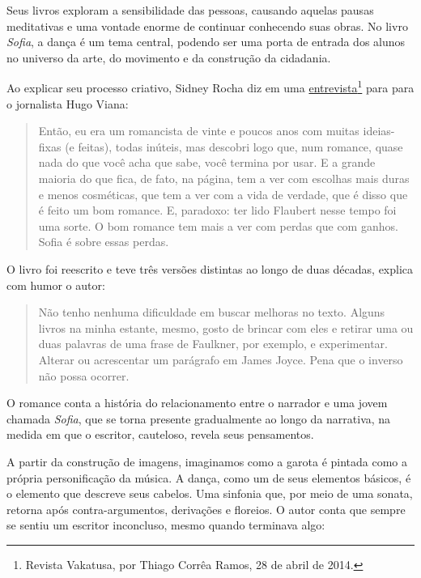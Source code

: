 \documentclass[12pt]{extarticle}
\begin{document}
Seus livros exploram a sensibilidade das pessoas, causando aquelas pausas
meditativas e uma vontade enorme de continuar conhecendo suas obras.  No livro
\textit{Sofia}, a dança é um tema central, podendo ser uma porta de entrada dos alunos
no universo da arte, do movimento e da construção da cidadania. 

Ao explicar seu processo criativo, Sidney Rocha diz em uma 
\href{http://www.vacatussa.com/entrevista-sidney-rocha/}{entrevista}\footnote{
  Revista Vakatusa, por Thiago Corrêa Ramos, 28 de abril de 2014.} para para 
o jornalista Hugo Viana:


\begin{quote}
Então, eu era um romancista de vinte e poucos anos com muitas ideias-fixas (e feitas), todas inúteis, mas descobri logo que, num romance, quase nada do que você acha que sabe, você termina por usar. E a grande maioria do que fica, de fato, na página, tem a ver com escolhas mais duras e menos cosméticas, que tem a ver com a vida de verdade, que é disso que é feito um bom romance. E, paradoxo: ter lido Flaubert nesse tempo foi uma sorte. O bom romance tem mais a ver com perdas que com ganhos. Sofia é sobre essas perdas. 
\end{quote}

O livro foi reescrito e teve três versões distintas ao longo de duas décadas, explica com 
humor o autor:

\begin{quote}
 Não tenho nenhuma dificuldade em buscar melhoras no texto. Alguns livros na minha estante, mesmo, gosto de brincar com eles e retirar uma ou duas palavras de uma frase de Faulkner, por exemplo, e experimentar. Alterar ou acrescentar um parágrafo em James Joyce. Pena que o inverso não possa ocorrer.
\end{quote}


O romance conta a história do relacionamento entre o narrador e uma
jovem chamada \textit{Sofia}, que se torna
presente gradualmente ao longo da narrativa, na medida em que  
o escritor, cauteloso, revela seus pensamentos.  

A partir da construção de imagens, imaginamos como a garota é pintada como a própria personificação da música. A dança, como 
um de seus elementos básicos, é o elemento que descreve seus
cabelos. Uma sinfonia que, por meio de uma
sonata, retorna após contra-argumentos, derivações e floreios.  
O autor conta que sempre se sentiu um escritor inconcluso, mesmo quando terminava algo:
\end{document}
